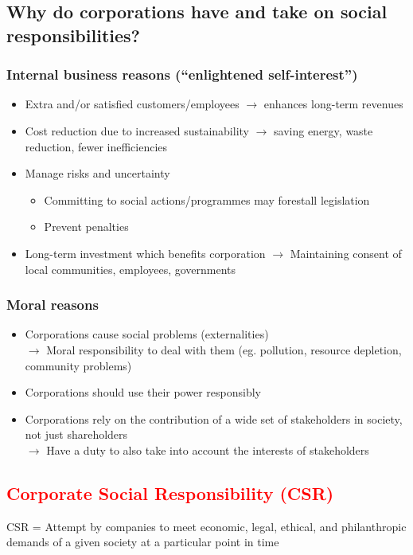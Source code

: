 \documentclass{article}
\DeclareRobustCommand{\k}[1]{\textcolor{red}{#1}}
\begin{document}
\subsection{Why do corporations have and take on social responsibilities?}
\subsubsection{Internal business reasons (``enlightened self-interest'')}
\begin{itemize}
    \item Extra and/or satisfied customers/employees $\to$ enhances long-term revenues
    \item Cost reduction due to increased sustainability $\to$ saving energy, waste reduction, fewer inefficiencies
    \item Manage risks and uncertainty
    \begin{itemize}[label=$\to$]
        \item Committing to social actions/programmes may forestall legislation
        \item Prevent penalties
    \end{itemize}
    \item Long-term investment which benefits corporation $\to$ Maintaining consent of local communities, employees, governments
\end{itemize}

\subsubsection{Moral reasons}
\begin{itemize}
    \item Corporations cause social problems (externalities)\\
        $\to$ Moral responsibility to deal with them (eg. pollution, resource depletion, community problems)
    \item Corporations should use their power responsibly
    \item Corporations rely on the contribution of a wide set of stakeholders in society, not just shareholders\\
        $\to$ Have a duty to also take into account the interests of stakeholders
\end{itemize}

\subsection{\k{Corporate Social Responsibility (CSR)}}
CSR = Attempt by companies to meet economic, legal, ethical, and philanthropic demands of a given society at a particular point in time
\end{document}
